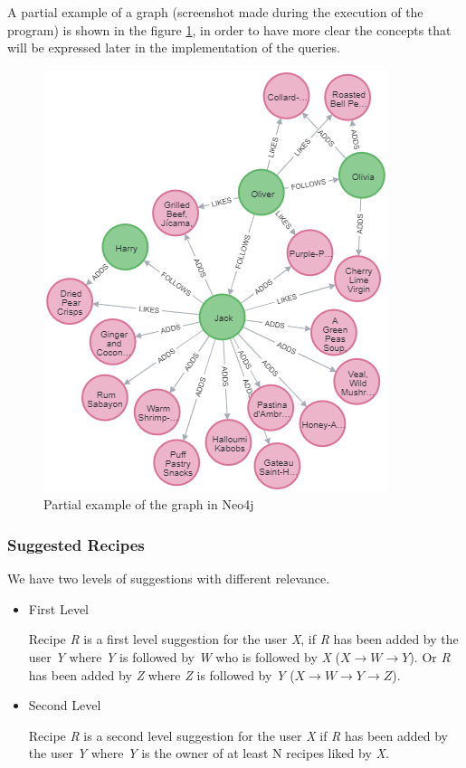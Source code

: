 \documentclass[a4paper]{report}
\begin{document}
\noindent A partial example of a graph (screenshot made during the execution of the program) is shown in the figure \ref{img: Partial example of the graph in Neo4j}, in order to have more clear the concepts that will be expressed later in the implementation of the queries.
\begin{figure}[htpb]
	\centering
	\includegraphics[scale=0.7]{img/graphScreen.png}
	\caption{Partial example of the graph in Neo4j}
	\label{img: Partial example of the graph in Neo4j}
\end{figure}


\subsubsection{Suggested Recipes}
We have two levels of suggestions with different relevance.
\begin{itemize}
	\item First Level
	
	\noindent Recipe \emph{R} is a first level suggestion for the user \emph{X}, if \emph{R} has been added by the user \emph{Y} where \emph{Y} is followed by \emph{W} who is followed by \emph{X} ($X \rightarrow W \rightarrow Y$). Or \emph{R} has been added by \emph{Z} where \emph{Z} is followed by \emph{Y} ($ X \rightarrow W \rightarrow Y \rightarrow Z$).
	
	\item Second Level
	
	\noindent Recipe \emph{R} is a second level suggestion for the user \emph{X} if \emph{R} has been added by the user \emph{Y} where \emph{Y} is the owner of at least N recipes liked by \emph{X}.
	
\end{itemize}
\end{document}
